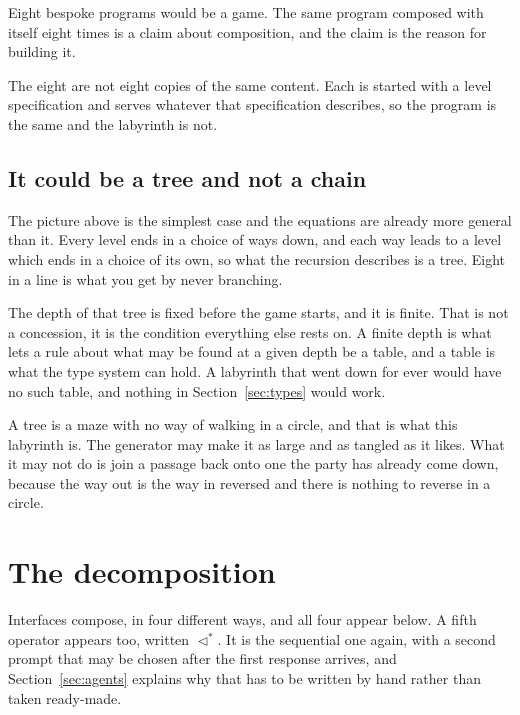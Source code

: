\documentclass[11pt,a4paper]{article}
\newcommand{\seqb}{\lhd^{\ast}}
\begin{document}
Eight bespoke programs would be a game. The same program composed with itself eight times is a
claim about composition, and the claim is the reason for building it.

The eight are not eight copies of the same content. Each is started with a level specification
and serves whatever that specification describes, so the program is the same and the labyrinth
is not.

\subsection{It could be a tree and not a chain}

The picture above is the simplest case and the equations are already more general than it. Every
level ends in a choice of ways down, and each way leads to a level which ends in a choice of its
own, so what the recursion describes is a tree. Eight in a line is what you get by never
branching.

The depth of that tree is fixed before the game starts, and it is finite. That is not a
concession, it is the condition everything else rests on. A finite depth is what lets a rule
about what may be found at a given depth be a table, and a table is what the type system can
hold. A labyrinth that went down for ever would have no such table, and nothing in
Section~\ref{sec:types} would work.

A tree is a maze with no way of walking in a circle, and that is what this labyrinth is. The
generator may make it as large and as tangled as it likes. What it may not do is join a passage
back onto one the party has already come down, because the way out is the way in reversed and
there is nothing to reverse in a circle.

\section{The decomposition}
\label{sec:decomp}

Interfaces compose, in four different ways, and all four appear below. A fifth operator appears
too, written $\seqb$. It is the sequential one again, with a second prompt that may be chosen
after the first response arrives, and Section~\ref{sec:agents} explains why that has to be written
by hand rather than taken ready-made.
\end{document}

